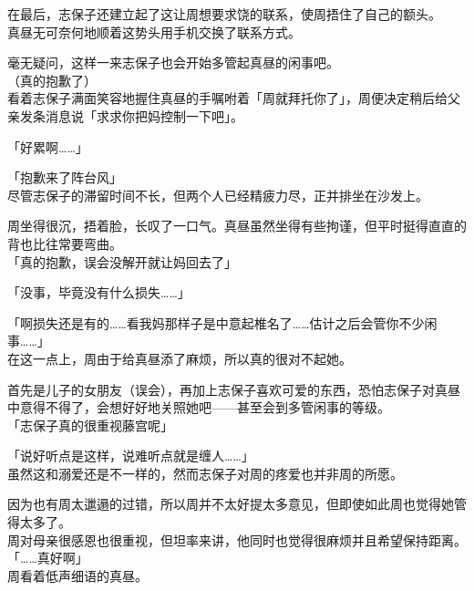 在最后，志保子还建立起了这让周想要求饶的联系，使周捂住了自己的额头。\\

真昼无可奈何地顺着这势头用手机交换了联系方式。

毫无疑问，这样一来志保子也会开始多管起真昼的闲事吧。\\

（真的抱歉了）\\

看着志保子满面笑容地握住真昼的手嘱咐着「周就拜托你了」，周便决定稍后给父亲发条消息说「求求你把妈控制一下吧」。\\

\vspace{2\baselineskip}

「好累啊……」

「抱歉来了阵台风」\\

尽管志保子的滞留时间不长，但两个人已经精疲力尽，正并排坐在沙发上。

周坐得很沉，捂着脸，长叹了一口气。真昼虽然坐得有些拘谨，但平时挺得直直的背也比往常要弯曲。\\

「真的抱歉，误会没解开就让妈回去了」

「没事，毕竟没有什么损失……」

「啊损失还是有的……看我妈那样子是中意起椎名了……估计之后会管你不少闲事……」\\

在这一点上，周由于给真昼添了麻烦，所以真的很对不起她。

首先是儿子的女朋友（误会），再加上志保子喜欢可爱的东西，恐怕志保子对真昼中意得不得了，会想好好地关照她吧——甚至会到多管闲事的等级。\\

「志保子真的很重视藤宫呢」

「说好听点是这样，说难听点就是缠人……」\\

虽然这和溺爱还是不一样的，然而志保子对周的疼爱也并非周的所愿。

因为也有周太邋遢的过错，所以周并不太好提太多意见，但即使如此周也觉得她管得太多了。\\

周对母亲很感恩也很重视，但坦率来讲，他同时也觉得很麻烦并且希望保持距离。\\

「……真好啊」\\

周看着低声细语的真昼。\\

